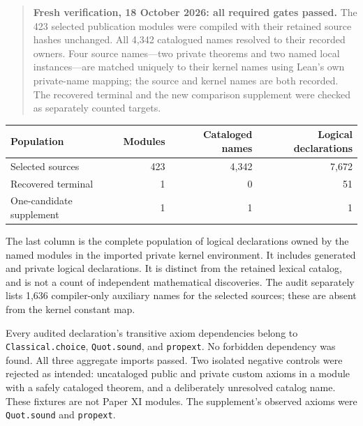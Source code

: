 \begin{quote}
\textbf{Fresh verification, 18 October 2026: all required gates passed.}
The 423 selected publication modules were compiled with their retained source
hashes unchanged. All 4,342 catalogued names resolved to their recorded owners.
Four source names---two private theorems and two named local instances---are
matched uniquely to their kernel names using Lean's own private-name mapping;
the source and kernel names are both recorded.
The recovered terminal and the new comparison supplement were checked as
separately counted targets.
\end{quote}

\begin{center}\small
\begin{tabular}{@{}lrrr@{}}
\toprule
Population & Modules & Cataloged names & Logical declarations\\
\midrule
Selected sources & 423 & 4,342 & 7,672\\
Recovered terminal & 1 & 0 & 51\\
One-candidate supplement & 1 & 1 & 1\\
\bottomrule
\end{tabular}
\end{center}

The last column is the complete population of logical declarations owned by
the named modules in the imported private kernel environment. It includes
generated and private logical declarations. It is distinct from the retained
lexical catalog, and is not a count of independent mathematical discoveries.
The audit separately lists 1,636 compiler-only auxiliary names for
the selected sources; these are absent from the kernel constant map.

Every audited declaration's transitive axiom dependencies belong to
\texttt{Classical.choice}, \texttt{Quot.sound}, and \texttt{propext}.
No forbidden dependency was found. All three aggregate imports passed.
Two isolated negative controls were rejected as intended: uncataloged public
and private custom axioms in a module with a safely cataloged theorem, and a
deliberately unresolved catalog name. These fixtures are not Paper XI modules.
The supplement's observed axioms were \texttt{Quot.sound} and \texttt{propext}.

